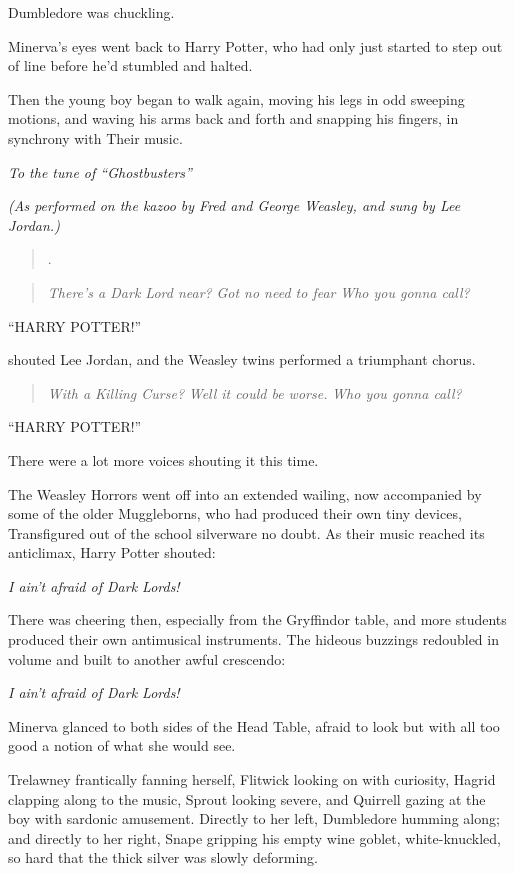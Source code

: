 Dumbledore was chuckling.

Minerva's eyes went back to Harry Potter, who had only just started to
step out of line before he'd stumbled and halted.

Then the young boy began to walk again, moving his legs in odd sweeping
motions, and waving his arms back and forth and snapping his fingers, in
synchrony with Their music.

\emph{To the tune of ``Ghostbusters''}

\emph{(As performed on the kazoo by Fred and George Weasley, and sung by
Lee Jordan.)}

\begin{quote}
.
\end{quote}

\begin{quote}
\emph{There's a Dark Lord near?} \emph{Got no need to fear} \emph{Who
you gonna call?}
\end{quote}

``HARRY POTTER!''

shouted Lee Jordan, and the Weasley twins performed a triumphant chorus.

\begin{quote}
\emph{With a Killing Curse?} \emph{Well it could be worse.} \emph{Who
you gonna call?}
\end{quote}

``HARRY POTTER!''

There were a lot more voices shouting it this time.

The Weasley Horrors went off into an extended wailing, now accompanied
by some of the older Muggleborns, who had produced their own tiny
devices, Transfigured out of the school silverware no doubt. As their
music reached its anticlimax, Harry Potter shouted:

\emph{I ain't afraid of Dark Lords!}

There was cheering then, especially from the Gryffindor table, and more
students produced their own antimusical instruments. The hideous
buzzings redoubled in volume and built to another awful crescendo:

\emph{I ain't afraid of Dark Lords!}

Minerva glanced to both sides of the Head Table, afraid to look but with
all too good a notion of what she would see.

Trelawney frantically fanning herself, Flitwick looking on with
curiosity, Hagrid clapping along to the music, Sprout looking severe,
and Quirrell gazing at the boy with sardonic amusement. Directly to her
left, Dumbledore humming along; and directly to her right, Snape
gripping his empty wine goblet, white-knuckled, so hard that the thick
silver was slowly deforming.

